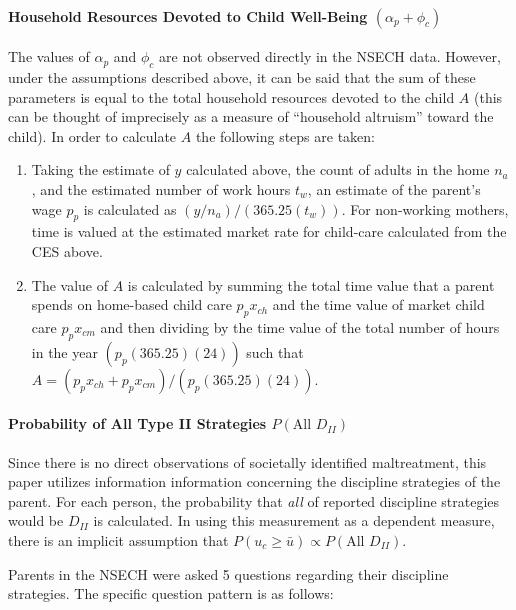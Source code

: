 \paragraph{Household Resources Devoted to Child Well-Being
$(\alpha_p + \phi_c)$}\label{household-resources-devoted-to-child-well-being-alphaux5fp-phiux5fc}

The values of $\alpha_p$ and $\phi_c$ are not observed directly in the
NSECH data. However, under the assumptions described above, it can be
said that the sum of these parameters is equal to the total household
resources devoted to the child $A$ (this can be thought of imprecisely
as a measure of ``household altruism'' toward the child). In order to
calculate $A$ the following steps are taken:

\begin{enumerate}
\def\labelenumi{\arabic{enumi}.}
\item
  Taking the estimate of $y$ calculated above, the count of adults in
  the home $n_a$, and the estimated number of work hours $t_w$, an
  estimate of the parent's wage $p_p$ is calculated as
  $(y/n_a)/(365.25(t_w))$. For non-working mothers, time is valued at
  the estimated market rate for child-care calculated from the CES
  above.
\item
  The value of $A$ is calculated by summing the total time value that a
  parent spends on home-based child care $p_px_{ch}$ and the time value
  of market child care $p_px_{cm}$ and then dividing by the time value
  of the total number of hours in the year $(p_p(365.25)(24))$ such that
  $A=(p_px_{ch}+p_px_{cm})/(p_p(365.25)(24))$.
\end{enumerate}

\paragraph{Probability of All Type II Strategies
$P(\text{All } D_{II})$}\label{probability-of-all-type-ii-strategies-ptextall-dux5fii}

Since there is no direct observations of societally identified
maltreatment, this paper utilizes information information concerning the
discipline strategies of the parent. For each person, the probability
that \emph{all} of reported discipline strategies would be $D_{II}$ is
calculated. In using this measurement as a dependent measure, there is
an implicit assumption that
$P(u_c \ge \bar{u}) \propto  P(\text{All } D_{II})$.

Parents in the NSECH were asked 5 questions regarding their discipline
strategies. The specific question pattern is as follows:

